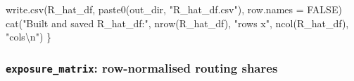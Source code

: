 \documentclass[
  11pt,
  letterpaper,
  DIV=11,
  numbers=noendperiod]{scrartcl}
\newenvironment{Shaded}{}{}
\newcommand{\AttributeTok}[1]{\textcolor[rgb]{0.84,0.23,0.29}{#1}}
\newcommand{\ConstantTok}[1]{\textcolor[rgb]{0.00,0.36,0.77}{#1}}
\newcommand{\FunctionTok}[1]{\textcolor[rgb]{0.44,0.26,0.76}{#1}}
\newcommand{\NormalTok}[1]{\textcolor[rgb]{0.14,0.16,0.18}{#1}}
\newcommand{\SpecialCharTok}[1]{\textcolor[rgb]{0.00,0.36,0.77}{#1}}
\newcommand{\StringTok}[1]{\textcolor[rgb]{0.01,0.18,0.38}{#1}}
\begin{document}
\begin{Shaded}
\begin{Highlighting}[]
  \FunctionTok{write.csv}\NormalTok{(R\_hat\_df, }\FunctionTok{paste0}\NormalTok{(out\_dir, }\StringTok{"R\_hat\_df.csv"}\NormalTok{),}
            \AttributeTok{row.names =} \ConstantTok{FALSE}\NormalTok{)}
  \FunctionTok{cat}\NormalTok{(}\StringTok{"Built and saved R\_hat\_df:"}\NormalTok{, }\FunctionTok{nrow}\NormalTok{(R\_hat\_df), }\StringTok{"rows x"}\NormalTok{,}
      \FunctionTok{ncol}\NormalTok{(R\_hat\_df), }\StringTok{"cols}\SpecialCharTok{\textbackslash{}n}\StringTok{"}\NormalTok{)}
\NormalTok{\}}
\end{Highlighting}
\end{Shaded}

\subsubsection{\texorpdfstring{\texttt{exposure\_matrix}: row-normalised
routing
shares}{exposure\_matrix: row-normalised routing shares}}\label{exposure_matrix-row-normalised-routing-shares}
\end{document}
